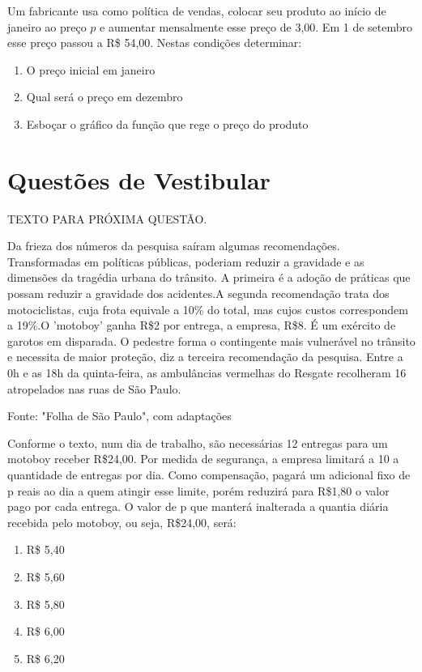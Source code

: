 				\item Um fabricante usa como política de vendas, colocar seu produto ao início de janeiro ao preço $p$ e aumentar mensalmente esse preço de 3,00. Em 1 de setembro esse preço passou a R\$ 54,00. Nestas condições determinar:
				\begin{enumerate}
					\item O preço inicial em janeiro
					\item Qual será o preço em dezembro
					\item Esboçar o gráfico da função que rege o preço do produto
				\end{enumerate}

		 		
		 	
	 	\section{Questões de Vestibular}
							
				\begin{center}
				\uppercase{Texto para próxima questão.}
				\end{center}
				Da  frieza  dos  números  da  pesquisa  saíram algumas recomendações. Transformadas em políticas públicas, poderiam reduzir a gravidade e as dimensões da tragédia urbana do trânsito. A   primeira é a adoção de práticas que possam reduzir a gravidade dos acidentes.A segunda     recomendação trata dos motociclistas, cuja frota equivale a 10\% do total, mas cujos custos   correspondem   a   19\%.O 'motoboy' ganha R\$2 por entrega, a empresa, R\$8. É um exército de garotos em disparada. O pedestre forma o contingente  mais vulnerável  no  trânsito  e  necessita  de  maior  proteção, diz a terceira recomendação da pesquisa. Entre a 0h e  as  18h  da  quinta-feira,  as  ambulâncias  vermelhas do  Resgate  recolheram  16  atropelados  nas  ruas  de São Paulo.
				
Fonte: "Folha de São Paulo", com adaptações
			
				\item  Conforme o texto, num dia de trabalho, são necessárias 12 entregas para um motoboy receber R\$24,00. Por medida de segurança, a empresa limitará a 10 a quantidade de entregas por dia. Como compensação, pagará um adicional fixo de p reais ao dia a quem atingir esse limite, porém reduzirá para R\$1,80 o valor pago por cada entrega. O valor de p que manterá inalterada a quantia diária recebida pelo motoboy, ou seja, R\$24,00, será:
				\begin{multicols}{5}				
				\begin{enumerate}
					\item R\$ 5,40
					\item R\$ 5,60
					\item R\$ 5,80
					\item R\$ 6,00
					\item R\$ 6,20
				\end{enumerate}
				\end{multicols}
				
